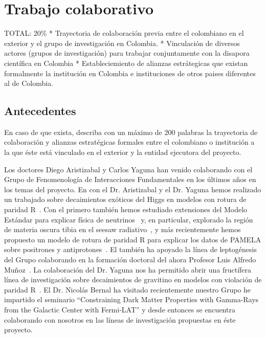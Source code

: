 
\section{Trabajo colaborativo}
\begin{evaluacion}
  TOTAL: 20\% 
  * Trayectoria de colaboración previa entre el colombiano
  en el exterior y el grupo de investigación en Colombia.
  * Vinculación de diversos actores (grupos de investigación) para
  trabajar conjuntamente con la disapora científica en Colombia
  * Estableciemiento de alianzas estrátegicas que existan formalmente
  la institución en Colombia e instituciones de otros paises
  diferentes al de Colombia.
\end{evaluacion}

\subsection{Antecedentes}
\begin{instrucciones}
  En caso de que exista, describa con un máximo de 200 palabras la
  trayectoria de colaboración y alianzas estratégicas formales entre
  el colombiano o institución a la que éste está vinculado en el
  exterior y la entidad ejecutora del proyecto.  
\end{instrucciones}
Los doctores Diego Aristizabal y Carlos Yaguna han venido colaborando
con el Grupo de Fenomenología de Interacciones Fundamentales en los
últimos años en los temas del proyecto. En con el Dr. Aristizabal y el
Dr. Yaguna hemos realizado un trabajado sobre decaimientos exóticos
del Higgs en modelos con rotura de
paridad R~\cite{AristizabalSierra:2008ye}. Con el primero también
hemos estudiado extensiones del Modelo Estándar para explicar física
de neutrinos~\cite{AristizabalSierra:2006ri,Sierra:2008wj} y, en particular, explorado la región de materia oscura tibia en el seesaw
radiativo~\cite{Sierra:2008wj}, y más recientemente hemos propuesto un
modelo de rotura de paridad R para explicar los datos de PAMELA sobre
positrones y antiprotones~\cite{Sierra:2009zq}. El también ha apoyado
la línea de leptogénesis del Grupo colaborando en la formación
doctoral del ahora Profesor Luis Alfredo
Muñoz~\cite{AristizabalSierra:2009bh,AristizabalSierra:2009mq,Sierra:2009bm,AristizabalSierra:2009bh,AristizabalSierra:2007ur,Aristizabal:2003zn}. La
colaboración del Dr. Yaguna nos ha permitido abrir una fructífera
línea de investigación sobre decaimientos de gravitino en modelos con
violación de paridad R~\cite{Choi:2010jt}. El Dr. Nicolás Bernal ha
visitado recientemente nuestro Grupo he impartido el seminario
``Constraining Dark Matter Properties with Gamma-Rays from the
Galactic Center with Fermi-LAT'' y desde entonces se encuentra
colaborando con nosotros en las líneas de investigación propuestas en
éste proyecto.
